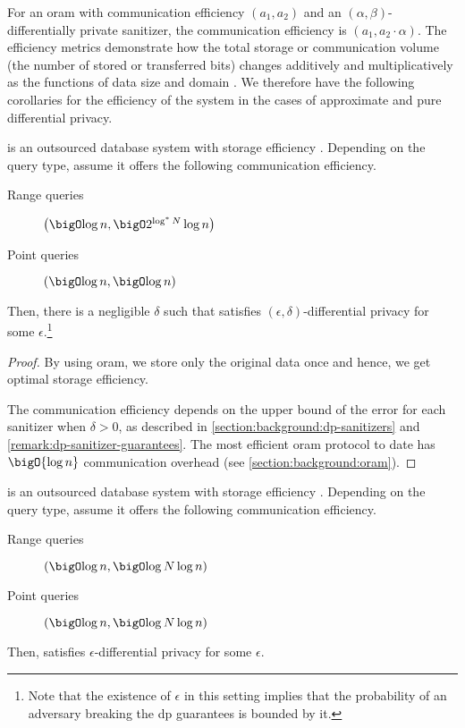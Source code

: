 		For an \acrshort{oram} with communication efficiency $(a_1, a_2)$ and an $(\alpha, \beta)$-differentially private sanitizer, the \epsolute{} communication efficiency is $(a_1, a_2 \cdot \alpha)$.
		The efficiency metrics demonstrate how the total storage or communication volume (the number of stored or transferred bits) changes additively and multiplicatively as the functions of data size \dataSize{} and domain \domainSize{}.
		We therefore have the following corollaries for the efficiency of the system in the cases of approximate and pure differential privacy.
		\begin{corollary}\label{corollary:comm-efficiency-approximate-dp}
			\epsolute{} is an outsourced database system with storage efficiency .
			Depending on the query type, assume it offers the following communication efficiency.
			\begin{description}
				\item[Range queries] $\efficiency{\log \dataSize}{2^{\log^* \domainSize} \log \dataSize}$
				\item[Point queries] $\efficiency{\log \dataSize}{\log \dataSize}$
			\end{description}
			Then, there is a negligible $\delta$ such that \epsolute{} satisfies $(\epsilon, \delta)$\hyp{}differential privacy for some $\epsilon$.\footnote{
				Note that the existence of $\epsilon$ in this setting implies that the probability of an adversary breaking the \acrshort{dp} guarantees is bounded by it.
			}
		\end{corollary}

		\begin{proof}
			By using \acrshort{oram}, we store only the original data once and hence, we get optimal storage efficiency.

			The communication efficiency depends on the upper bound of the error for each sanitizer when $\delta > 0$, as described in \cref{section:background:dp-sanitizers} and \cref{remark:dp-sanitizer-guarantees}.
			The most efficient \acrshort{oram} protocol to date has $\bigO{\log \dataSize}$ communication overhead (see \cref{section:background:oram}).
		\end{proof}

		\begin{corollary}\label{corollary:comm-efficiency-pure-dp}
			\epsolute{} is an outsourced database system with storage efficiency .
			Depending on the query type, assume it offers the following communication efficiency.
			\begin{description}
				\item[Range queries] $\efficiency{\log \dataSize}{\log \domainSize \log \dataSize}$
				\item[Point queries] $\efficiency{\log \dataSize}{\log \domainSize \log \dataSize}$
			\end{description}
			Then, \epsolute{} satisfies $\epsilon$-differential privacy for some $\epsilon$.
		\end{corollary}


